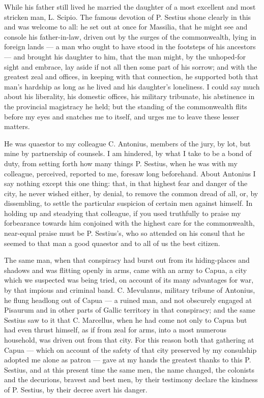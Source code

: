  While his father still lived he married the daughter of a most excellent and most stricken man, L. Scipio. The famous devotion of P. Sestius shone clearly in this and was welcome to all: he set out at once for Massilia, that he might see and console his father-in-law, driven out by the surges of the commonwealth, lying in foreign lands --- a man who ought to have stood in the footsteps of his ancestors --- and brought his daughter to him, that the man might, by the unhoped-for sight and embrace, lay aside if not all then some part of his sorrow; and with the greatest zeal and offices, in keeping with that connection, he supported both that man's hardship as long as he lived and his daughter's loneliness. I could say much about his liberality, his domestic offices, his military tribunate, his abstinence in the provincial magistracy he held; but the standing of the commonwealth flits before my eyes and snatches me to itself, and urges me to leave these lesser matters.

 He was quaestor to my colleague C. Antonius, members of the jury, by lot, but mine by partnership of counsels. I am hindered, by what I take to be a bond of duty, from setting forth how many things P. Sestius, when he was with my colleague, perceived, reported to me, foresaw long beforehand. About Antonius I say nothing except this one thing: that, in that highest fear and danger of the city, he never wished either, by denial, to remove the common dread of all, or, by dissembling, to settle the particular suspicion of certain men against himself. In holding up and steadying that colleague, if you used truthfully to praise my forbearance towards him conjoined with the highest care for the commonwealth, near-equal praise must be P. Sestius's, who so attended on his consul that he seemed to that man a good quaestor and to all of us the best citizen.

 The same man, when that conspiracy had burst out from its hiding-places and shadows and was flitting openly in arms, came with an army to Capua, a city which we suspected was being tried, on account of its many advantages for war, by that impious and criminal band. C. Mevulanus, military tribune of Antonius, he flung headlong out of Capua --- a ruined man, and not obscurely engaged at Pisaurum and in other parts of Gallic territory in that conspiracy; and the same Sestius saw to it that C. Marcellus, when he had come not only to Capua but had even thrust himself, as if from zeal for arms, into a most numerous household, was driven out from that city. For this reason both that gathering at Capua --- which on account of the safety of that city preserved by my consulship adopted me alone as patron --- gave at my hands the greatest thanks to this P. Sestius, and at this present time the same men, the name changed, the colonists and the decurions, bravest and best men, by their testimony declare the kindness of P. Sestius, by their decree avert his danger.

